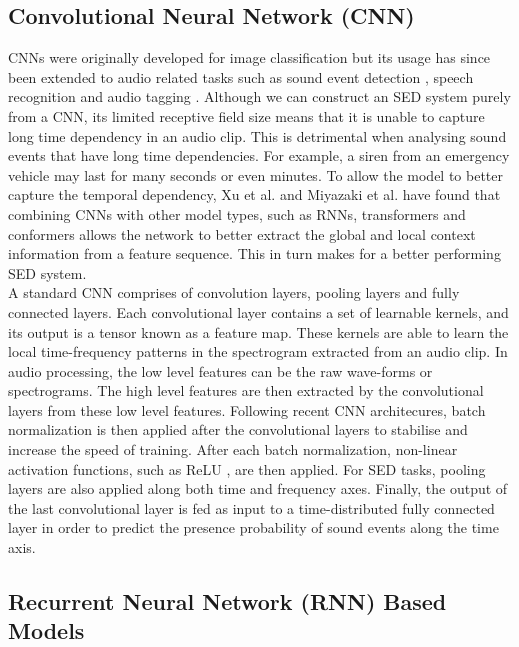 \subsection{Convolutional Neural Network (CNN)}
CNNs were originally developed for image classification \cite{NIPS2012_cnn} but its usage has since been extended to audio related tasks such as sound event detection \cite{kong2020sound}, speech recognition \cite{cnn-asr} and audio tagging \cite{cnn-at}. Although we can construct an SED system purely from a CNN, its limited receptive field size means that it is unable to capture long time dependency in an audio clip. This is detrimental when analysing sound events that have long time dependencies. For example, a siren from an emergency vehicle may last for many seconds or even minutes. To allow the model to better capture the temporal dependency, Xu et al. \cite{xu2017convolutional} and Miyazaki et al. \cite{Miyazaki2020CONFORMERBASEDSE} have found that combining CNNs with other model types, such as RNNs, transformers and conformers allows the network to better extract the global and local context information from a feature sequence. This in turn makes for a better performing SED system.\\

A standard CNN comprises of convolution layers, pooling layers and fully connected layers. Each convolutional layer contains a set of learnable kernels, and its output is a tensor known as a feature map. These kernels are able to learn the local time-frequency patterns in the spectrogram extracted from an audio clip. In audio processing, the low level features \cite{thickstun2017learning} can be the raw wave-forms or spectrograms. The high level features are then extracted by the convolutional layers from these low level features. Following recent CNN architecures, batch normalization \cite{ioffe2015batch} is then applied after the convolutional layers to stabilise and increase the speed of training. After each batch normalization, non-linear activation functions, such as ReLU \cite{relu}, are then applied. For SED tasks, pooling layers are also applied along both time and frequency axes. Finally, the output of the last convolutional layer is fed as input to a time-distributed fully connected layer in order to predict the presence probability of sound events along the time axis. 

\subsection{Recurrent Neural Network (RNN) Based Models}

